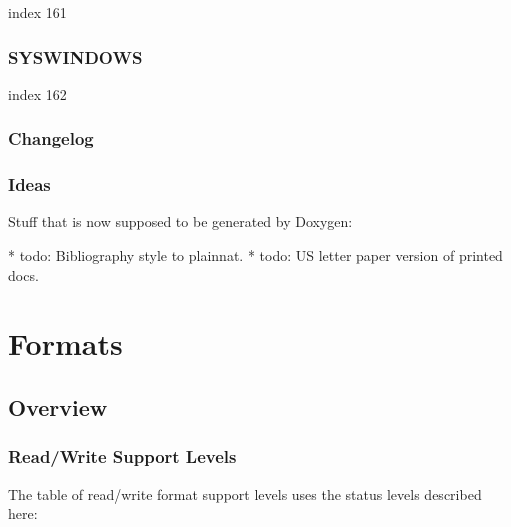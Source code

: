 \documentclass[11pt]{report}
\begin{document}
index 161

\subsection{SYSWINDOWS}

index 162


\subsection{Changelog}

\subsection{Ideas}

Stuff that is now supposed to be generated by Doxygen:

* todo: Bibliography style to plainnat.
* todo: US letter paper version of printed docs.

\chapter{Formats}

\section{Overview}

\subsection{Read/Write Support Levels}

The table of read/write format support levels uses the status levels described here:
\end{document}

